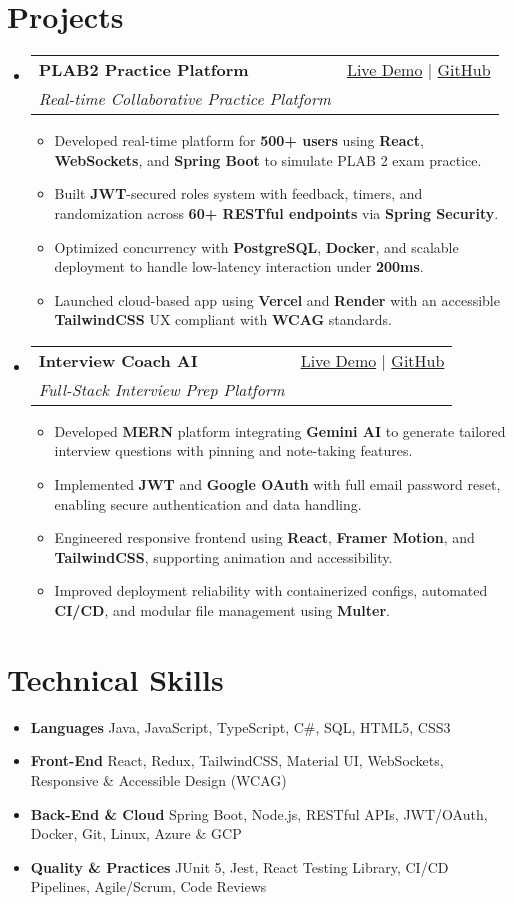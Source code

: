 \documentclass[letterpaper,11pt]{article}
\makeatletter
\newcommand{\resumeItem}[1]{\item\small{#1 \vspace{-2pt}}}
\newcommand{\resumeSubheading}[4]{
  \vspace{-1pt}\item
    \begin{tabular*}{0.97\textwidth}[t]{l@{\extracolsep{\fill}}r}
      \textbf{#1} & #2 \\
      \textit{\small#3} & \textit{\small #4} \\
    \end{tabular*}\vspace{-5pt}
}
\newcommand{\resumeSubHeadingListStart}{\begin{itemize}[leftmargin=*]}
\newcommand{\resumeSubHeadingListEnd}{\end{itemize}}
\newcommand{\resumeItemListStart}{\begin{itemize}}
\newcommand{\resumeItemListEnd}{\end{itemize}\vspace{-5pt}}
\makeatother
\begin{document}
\section{Projects}
  \resumeSubHeadingListStart
    \resumeSubheading
      {\textbf{PLAB2 Practice Platform}}{\href{https://plab2practice.com}{Live Demo} | \href{https://github.com/altansaid/plab2projectnew}{GitHub}}
      {Real-time Collaborative Practice Platform}{}
      \resumeItemListStart
        \resumeItem{Developed real-time platform for \textbf{500+ users} using \textbf{React}, \textbf{WebSockets}, and \textbf{Spring Boot} to simulate PLAB 2 exam practice.}
        \resumeItem{Built \textbf{JWT}-secured roles system with feedback, timers, and randomization across \textbf{60+ RESTful endpoints} via \textbf{Spring Security}.}
        \resumeItem{Optimized concurrency with \textbf{PostgreSQL}, \textbf{Docker}, and scalable deployment to handle low-latency interaction under \textbf{200ms}.}
        \resumeItem{Launched cloud-based app using \textbf{Vercel} and \textbf{Render} with an accessible \textbf{TailwindCSS} UX compliant with \textbf{WCAG} standards.}
      \resumeItemListEnd

    \resumeSubheading
      {\textbf{Interview Coach AI}}{\href{https://interviewcoach-ai.vercel.app}{Live Demo} | \href{https://github.com/altansaid/interviewcoach-ai}{GitHub}}
      {Full-Stack Interview Prep Platform}{}
      \resumeItemListStart
        \resumeItem{Developed \textbf{MERN} platform integrating \textbf{Gemini AI} to generate tailored interview questions with pinning and note-taking features.}
        \resumeItem{Implemented \textbf{JWT} and \textbf{Google OAuth} with full email password reset, enabling secure authentication and data handling.}
        \resumeItem{Engineered responsive frontend using \textbf{React}, \textbf{Framer Motion}, and \textbf{TailwindCSS}, supporting animation and accessibility.}
        \resumeItem{Improved deployment reliability with containerized configs, automated \textbf{CI/CD}, and modular file management using \textbf{Multer}.}
      \resumeItemListEnd
  \resumeSubHeadingListEnd

\section{Technical Skills}
  \resumeItemListStart
    \resumeItem{\textbf{Languages}}{Java, JavaScript, TypeScript, C\#, SQL, HTML5, CSS3}
    \resumeItem{\textbf{Front-End}}{React, Redux, TailwindCSS, Material UI, WebSockets, Responsive \& Accessible Design (WCAG)}
    \resumeItem{\textbf{Back-End \& Cloud}}{Spring Boot, Node.js, RESTful APIs, JWT/OAuth, Docker, Git, Linux, Azure \& GCP}
    \resumeItem{\textbf{Quality \& Practices}}{JUnit 5, Jest, React Testing Library, CI/CD Pipelines, Agile/Scrum, Code Reviews}
  \resumeItemListEnd
\end{document}

